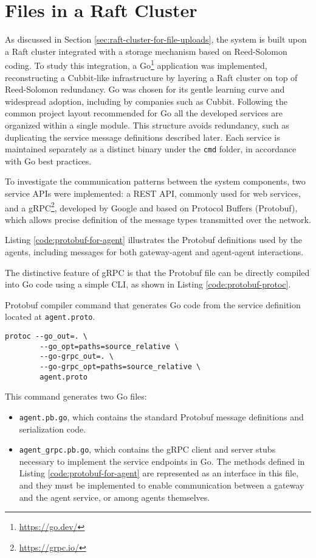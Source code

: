 \section{Files in a Raft Cluster}

As discussed in Section \ref{sec:raft-cluster-for-file-uploads}, the system is built upon a Raft cluster integrated with a storage mechanism based on Reed-Solomon coding. To study this integration, a Go\footnote{\url{https://go.dev/}} application was implemented, reconstructing a Cubbit-like infrastructure by layering a Raft cluster on top of Reed-Solomon redundancy. Go was chosen for its gentle learning curve and widespread adoption, including by companies such as Cubbit. Following the common project layout recommended for Go\cite{go-modules-layout} all the developed services are organized within a single module. This structure avoids redundancy, such as duplicating the service message definitions described later. Each service is maintained separately as a distinct binary under the \texttt{cmd} folder, in accordance with Go best practices.



To investigate the communication patterns between the system components, two service
APIs were implemented: a REST API, commonly used for web services, and a
gRPC\footnote{\url{https://grpc.io/}}, developed by Google and based on Protocol
Buffers (Protobuf), which allows precise definition of the message types transmitted over the network.

Listing \ref{code:protobuf-for-agent} illustrates the Protobuf definitions used by the agents, including messages for both gateway-agent and agent-agent interactions.

The distinctive feature of gRPC is that the Protobuf file can be directly compiled into Go code using a simple CLI, as shown in Listing \ref{code:protobuf-protoc}.

\begin{listing}[H]
\caption{Protobuf compiler command that generates Go code from the service definition located at \texttt{agent.proto}.}
\label{code:protobuf-protoc}
\begin{verbatim}
protoc --go_out=. \
        --go_opt=paths=source_relative \
        --go-grpc_out=. \
        --go-grpc_opt=paths=source_relative \
        agent.proto
\end{verbatim}
\end{listing}

This command generates two Go files: 
\begin{itemize}
    \item \texttt{agent.pb.go}, which contains the standard Protobuf message definitions and serialization code.
    \item \texttt{agent\_grpc.pb.go}, which contains the gRPC client and server stubs necessary to implement the service endpoints in Go. The methods defined in Listing \ref{code:protobuf-for-agent} are represented as an interface in this file, and they must be implemented to enable communication between a gateway and the agent service, or among agents themselves.
\end{itemize}

